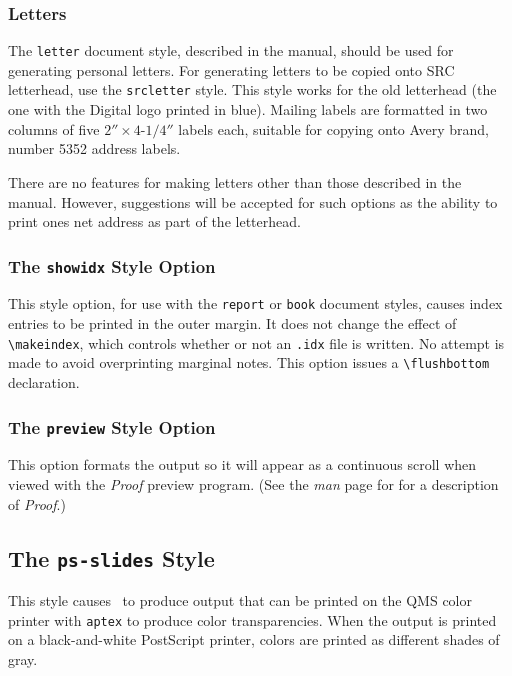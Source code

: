 \subsubsection{Letters} \label{sec:letters}

The \mbox{\tt letter} document style, described in the manual, should
be used for generating personal letters.  For generating letters to be
copied onto SRC letterhead, use the \mbox{\tt srcletter} style.  This
style works for the old letterhead (the one with the Digital logo
printed in blue).  Mailing labels are formatted in two columns of five
$2''\times\mbox{4-1/4}''$ labels each, suitable for copying onto Avery
brand, number 5352 address labels.

There are no features for making letters other than those described in
the manual.  However, suggestions will be accepted for such options as
the ability to print ones net address as part of the letterhead.

\subsubsection{The {\tt showidx} Style Option}

This style option, for use with the {\tt report} or {\tt book} document
styles, causes index entries to be printed in the outer margin.  It
does not change the effect of \verb|\makeindex|, which controls
whether or not an {\tt .idx} file is written.  No attempt is made to
avoid overprinting marginal notes.  This option issues a 
\verb|\flushbottom| declaration.


\subsubsection{The {\tt preview} Style Option}

This option formats the output so it will appear as a continuous scroll
when viewed with the {\em Proof\/} preview program.  (See the {\em man\/}
page for for a description of {\em Proof}.)

\subsection{The {\tt ps-slides} Style} \label{sec:ps-slides}

This style causes \SLiTeX\ to produce output that can be printed on the
QMS color printer with {\tt aptex} to produce color transparencies.
When the output is printed on a black-and-white PostScript printer,
colors are printed as different shades of gray.

